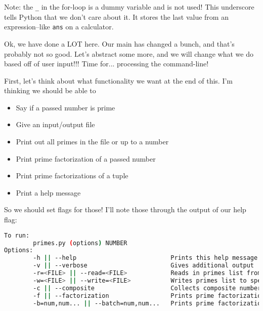 \documentclass[11pt, twoside, reqno]{book}
\begin{document}
Note: the \texttt{\_} in the for-loop is a dummy variable and is not used! This underscore tells Python that we don't care about it. It stores the last value from an expression--like \texttt{ans} on a calculator.

Ok, we have done a LOT here. Our main has changed a bunch, and that's probably not so good. Let's abstract some more, and we will change what we do based off of user input!!! Time for... processing the command-line!

First, let's think about what functionality we want at the end of this. I'm thinking we should be able to
\begin{itemize} \item Say if a passed number is prime\end{itemize}
\begin{itemize} \item Give an input/output file\end{itemize}
\begin{itemize} \item Print out all primes in the file or up to a number\end{itemize}
\begin{itemize} \item Print prime factorization of a passed number\end{itemize}
\begin{itemize} \item Print prime factorizations of a tuple\end{itemize}
\begin{itemize} \item Print a help message\end{itemize}

So we should set flags for those! I'll note those through the output of our help flag:
\begin{lstlisting}[language=sh]
To run:
        primes.py (options) NUMBER
Options:
        -h || --help                          Prints this help message
        -v || --verbose                       Gives additional output
        -r=<FILE> || --read=<FILE>            Reads in primes list from specified file (JSON)
        -w=<FILE> || --write=<FILE>           Writes primes list to specified file (JSON)
        -c || --composite                     Collects composite numbers also
        -f || --factorization                 Prints prime factorization of NUMBER
        -b=num,num... || --batch=num,num...   Prints prime factorization of num,num,num...
\end{lstlisting}
\end{document}

